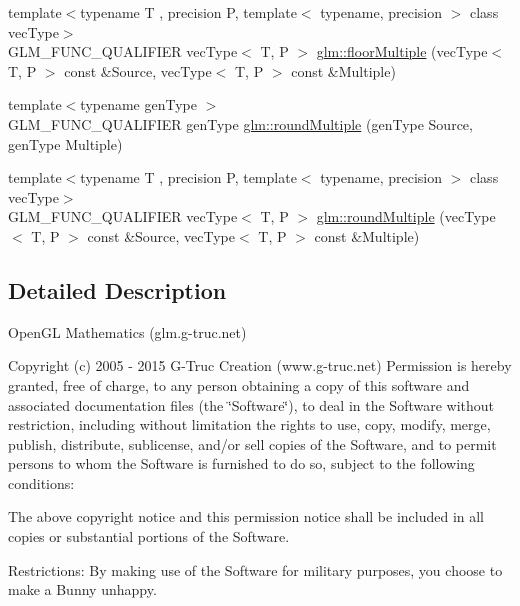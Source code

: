 \begin{DoxyCompactItemize}
\item 
{\footnotesize template$<$typename T , precision P, template$<$ typename, precision $>$ class vec\+Type$>$ }\\G\+L\+M\+\_\+\+F\+U\+N\+C\+\_\+\+Q\+U\+A\+L\+I\+F\+I\+E\+R vec\+Type$<$ T, P $>$ \hyperlink{group__gtc__round_ga6912db42d43873fe1dedb3aed2b7a239}{glm\+::floor\+Multiple} (vec\+Type$<$ T, P $>$ const \&Source, vec\+Type$<$ T, P $>$ const \&Multiple)
\item 
{\footnotesize template$<$typename gen\+Type $>$ }\\G\+L\+M\+\_\+\+F\+U\+N\+C\+\_\+\+Q\+U\+A\+L\+I\+F\+I\+E\+R gen\+Type \hyperlink{group__gtc__round_ga6739d1de04b2cea7c78675b365644bce}{glm\+::round\+Multiple} (gen\+Type Source, gen\+Type Multiple)
\item 
{\footnotesize template$<$typename T , precision P, template$<$ typename, precision $>$ class vec\+Type$>$ }\\G\+L\+M\+\_\+\+F\+U\+N\+C\+\_\+\+Q\+U\+A\+L\+I\+F\+I\+E\+R vec\+Type$<$ T, P $>$ \hyperlink{group__gtc__round_ga10a8ab7b254257b607b6a3fc68c3e661}{glm\+::round\+Multiple} (vec\+Type$<$ T, P $>$ const \&Source, vec\+Type$<$ T, P $>$ const \&Multiple)
\end{DoxyCompactItemize}


\subsection{Detailed Description}
Open\+G\+L Mathematics (glm.\+g-\/truc.\+net)

Copyright (c) 2005 -\/ 2015 G-\/\+Truc Creation (www.\+g-\/truc.\+net) Permission is hereby granted, free of charge, to any person obtaining a copy of this software and associated documentation files (the \char`\"{}\+Software\char`\"{}), to deal in the Software without restriction, including without limitation the rights to use, copy, modify, merge, publish, distribute, sublicense, and/or sell copies of the Software, and to permit persons to whom the Software is furnished to do so, subject to the following conditions\+:

The above copyright notice and this permission notice shall be included in all copies or substantial portions of the Software.

Restrictions\+: By making use of the Software for military purposes, you choose to make a Bunny unhappy.


